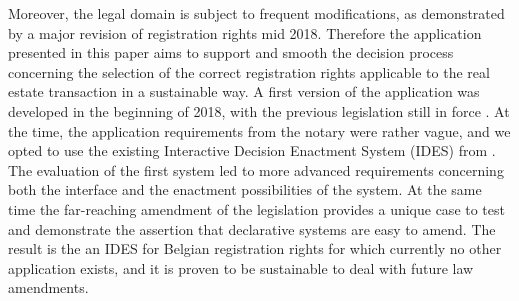 Moreover, the legal domain is subject to frequent modifications, as demonstrated by a major revision of registration rights mid 2018.
Therefore the application presented in this paper aims to support and smooth the decision process concerning the selection of the correct registration rights applicable to the real estate transaction in a sustainable way.
A first version of the application was developed in the beginning of 2018, with the previous legislation still in force \cite{Marjolein}.
At the time, the application requirements from the notary were rather vague, and we opted to use the existing Interactive Decision Enactment System (IDES) from \cite{Ingmar}.
The evaluation of the first system led to more advanced requirements concerning both the interface and the enactment possibilities of the system.
At the same time the far-reaching amendment of the legislation provides a unique case to test and demonstrate the assertion that declarative systems are easy to amend. 
The result is the an IDES for Belgian registration rights for which currently no other application exists, and it is proven to be sustainable to deal with future law amendments.



